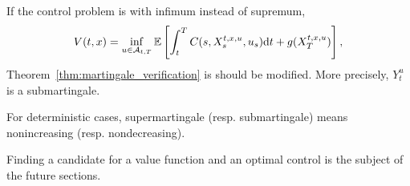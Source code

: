 \documentclass[11pt]{book}
\newcommand{\dd}{\text{\normalfont d}}
\newcommand{\dt}{\text{\normalfont d}t}
\newcommand{\ds}{\text{\normalfont d}s}
\newcommand{\dW}{\text{\normalfont d}W}
\begin{document}
\begin{rem}\label{rem:inf_submartingale}
If the control problem is with infimum instead of supremum,
\begin{equation}
V(t,x)=\inf_{u\in\mathcal{A}_{t,T}}\mathbb{E}\left[\int_{t}^{T}C(s,X_s^{t,x,u},u_s){\dt}+g(X_T^{t,x,u})\right],
\end{equation}
Theorem~\ref{thm:martingale_verification} is should be modified. More precisely, $Y_t^u$ is a submartingale. 

For deterministic cases, supermartingale (resp. submartingale) means nonincreasing (resp. nondecreasing).
\end{rem}
Finding a candidate for a value function and an optimal control is the subject of the future sections.
\end{document}
